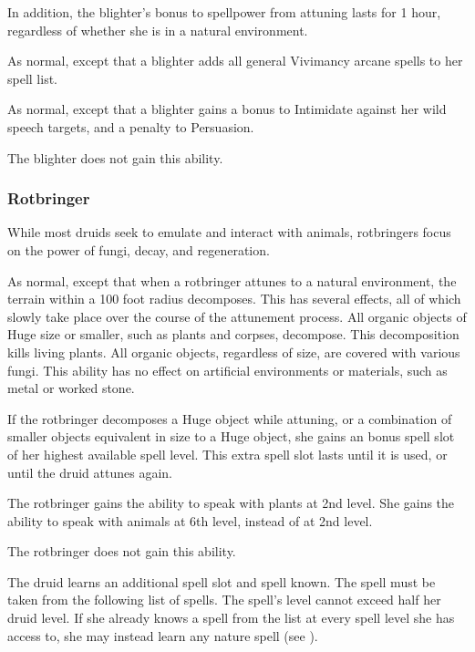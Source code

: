 In addition, the blighter's bonus to spellpower from attuning lasts for 1 hour, regardless of whether she is in a natural environment.

 As normal, except that a blighter adds all general Vivimancy arcane spells to her spell list.

 As normal, except that a blighter gains a  bonus to Intimidate against her wild speech targets, and a  penalty to Persuasion.

 The blighter does not gain this ability.



\subsubsection{Rotbringer}

While most druids seek to emulate and interact with animals, rotbringers focus on the power of fungi, decay, and regeneration.

 As normal, except that when a rotbringer attunes to a natural environment, the terrain within a 100 foot radius decomposes.
This has several effects, all of which slowly take place over the course of the attunement process.
All organic objects of Huge size or smaller, such as plants and corpses, decompose.
This decomposition kills living plants.
All organic objects, regardless of size, are covered with various fungi.
This ability has no effect on artificial environments or materials, such as metal or worked stone.

If the rotbringer decomposes a Huge object while attuning, or a combination of smaller objects equivalent in size to a Huge object, she gains an bonus spell slot of her highest available spell level.
This extra spell slot lasts until it is used, or until the druid attunes again.

 The rotbringer gains the ability to speak with plants at 2nd level.
She gains the ability to speak with animals at 6th level, instead of at 2nd level.

 The rotbringer does not gain this ability.

 The druid learns an additional spell slot and spell known.
The spell must be taken from the following list of spells.
The spell's level cannot exceed half her druid level.
If she already knows a spell from the list at every spell level she has access to, she may instead learn any nature spell (see ).

